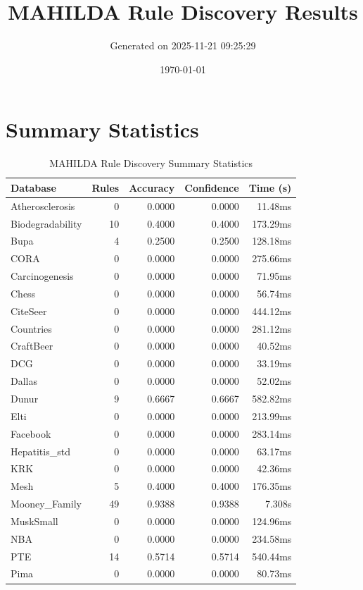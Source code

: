 \documentclass[11pt,a4paper]{article}
\title{MAHILDA Rule Discovery Results}
\author{Generated on 2025-11-21 09:25:29}
\date{\today}
\begin{document}
\maketitle

\section{Summary Statistics}
\begin{table}[h!]
\centering
\caption{MAHILDA Rule Discovery Summary Statistics}
\label{tab:mahilda_summary}
\begin{tabular}{|l|r|r|r|r|}
\hline
\textbf{Database} & \textbf{Rules} & \textbf{Accuracy} & \textbf{Confidence} & \textbf{Time (s)} \\
\hline
Atherosclerosis & 0 & 0.0000 & 0.0000 & 11.48ms \\
Biodegradability & 10 & 0.4000 & 0.4000 & 173.29ms \\
Bupa & 4 & 0.2500 & 0.2500 & 128.18ms \\
CORA & 0 & 0.0000 & 0.0000 & 275.66ms \\
Carcinogenesis & 0 & 0.0000 & 0.0000 & 71.95ms \\
Chess & 0 & 0.0000 & 0.0000 & 56.74ms \\
CiteSeer & 0 & 0.0000 & 0.0000 & 444.12ms \\
Countries & 0 & 0.0000 & 0.0000 & 281.12ms \\
CraftBeer & 0 & 0.0000 & 0.0000 & 40.52ms \\
DCG & 0 & 0.0000 & 0.0000 & 33.19ms \\
Dallas & 0 & 0.0000 & 0.0000 & 52.02ms \\
Dunur & 9 & 0.6667 & 0.6667 & 582.82ms \\
Elti & 0 & 0.0000 & 0.0000 & 213.99ms \\
Facebook & 0 & 0.0000 & 0.0000 & 283.14ms \\
Hepatitis_std & 0 & 0.0000 & 0.0000 & 63.17ms \\
KRK & 0 & 0.0000 & 0.0000 & 42.36ms \\
Mesh & 5 & 0.4000 & 0.4000 & 176.35ms \\
Mooney_Family & 49 & 0.9388 & 0.9388 & 7.308s \\
MuskSmall & 0 & 0.0000 & 0.0000 & 124.96ms \\
NBA & 0 & 0.0000 & 0.0000 & 234.58ms \\
PTE & 14 & 0.5714 & 0.5714 & 540.44ms \\
Pima & 0 & 0.0000 & 0.0000 & 80.73ms \\

\end{tabular}
\end{table}
\end{document}
